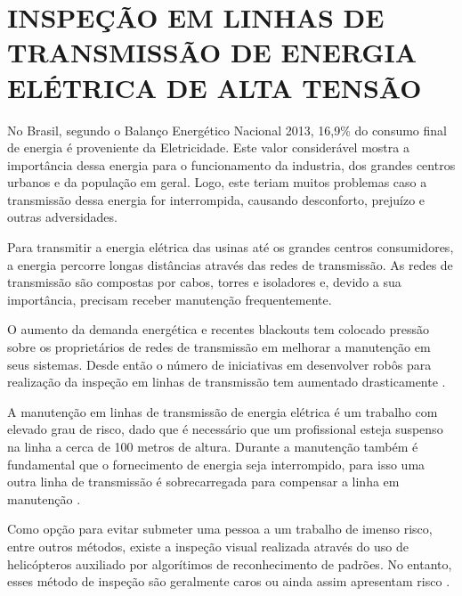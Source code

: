 \documentclass[12pt,oneside,a4paper, chapter=TITLE, section = TITLE, english, brazil]{abntex2}
\begin{document}

\section{INSPEÇÃO EM LINHAS DE TRANSMISSÃO DE ENERGIA ELÉTRICA DE ALTA TENSÃO}

No Brasil, segundo o Balanço Energético Nacional 2013, 16,9\% do consumo final de energia é proveniente da Eletricidade. Este valor considerável mostra a importância dessa energia para o funcionamento da industria, dos grandes centros urbanos e da população em geral. Logo, este teriam muitos problemas caso a transmissão dessa energia for interrompida, causando desconforto, prejuízo e outras adversidades.

Para transmitir a energia elétrica das usinas até os grandes centros consumidores, a energia percorre longas distâncias através das redes de transmissão. As redes de transmissão são compostas por cabos, torres e isoladores e, devido a sua importância, precisam receber manutenção frequentemente.

O aumento da demanda energética e recentes blackouts tem colocado pressão sobre os proprietários de redes de transmissão em melhorar a manutenção em seus sistemas. Desde então o número de iniciativas em desenvolver robôs para realização da inspeção em linhas de transmissão tem aumentado drasticamente \cite{transmission}.

A manutenção em linhas de transmissão de energia elétrica é um trabalho com elevado grau de risco, dado que é necessário que um profissional esteja suspenso na linha a cerca de 100 metros de altura. Durante a manutenção também é fundamental que o fornecimento de energia seja interrompido, para isso uma outra linha de transmissão é sobrecarregada para compensar a linha em manutenção \cite{expliner}.

Como opção para evitar submeter uma pessoa a um trabalho de imenso risco, entre outros métodos, existe a inspeção visual realizada através do uso de helicópteros auxiliado por algorítimos de reconhecimento de padrões. No entanto, esses método de inspeção são geralmente caros ou ainda assim apresentam risco .
\end{document}
